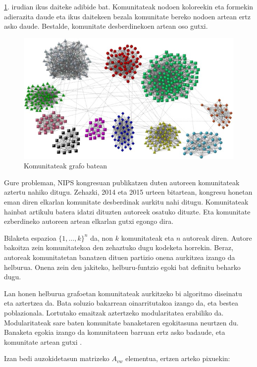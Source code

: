 \documentclass[sigconf]{acmart}
\begin{document}
\ref{fig:graph}. irudian ikus daiteke adibide bat. Komunitateak nodoen koloreekin eta formekin adierazita daude eta ikus daitekeen bezala komunitate bereko nodoen artean ertz asko daude. Bestalde, komunitate desberdinekoen artean oso gutxi.

\begin{figure}
    \centering
    \includegraphics[width=\linewidth]{example.jpg}
    \caption{Komunitateak grafo batean}
    \label{fig:graph}
\end{figure}

Gure probleman, NIPS kongresuan publikatzen duten autoreen komunitateak aztertu nahiko ditugu. Zehazki, 2014 eta 2015 urteen bitartean, kongresu honetan eman diren elkarlan komunitate desberdinak aurkitu nahi ditugu. Komunitateak hainbat artikulu batera idatzi dituzten autoreek osatuko dituzte. Eta komunitate ezberdineko autoreen artean elkarlan gutxi egongo dira. 

Bilaketa espazioa $\{1,…,k\}^n$ da, non $k$ komunitateak eta $n$ autoreak diren. Autore bakoitza zein komunitatekoa den zehaztuko dugu kodeketa horrekin. Beraz, autoreak komunitatetan banatzen dituen partizio onena aurkitzea izango da helburua. Onena zein den jakiteko, helburu-funtzio egoki bat definitu beharko dugu.

Lan honen helburua grafoetan komunitateak aurkitzeko bi algoritmo diseinatu eta aztertzea da. Bata soluzio bakarrean oinarritutakoa izango da, eta bestea poblazionala. Lortutako emaitzak aztertzeko modularitatea erabiliko da. Modularitateak sare baten komunitate banaketaren egokitasuna neurtzen du. Banaketa egokia izango da komunitateen barruan ertz asko badaude, eta komunitate artean gutxi \cite{clauset2004finding}.

Izan bedi auzokidetasun matrizeko $A_{vw}$ elementua,  ertzen arteko pixuekin:
\end{document}
